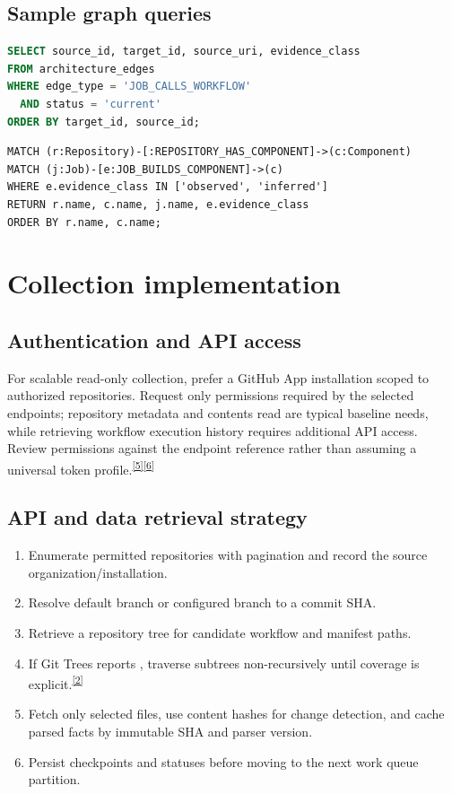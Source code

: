 \documentclass[11pt,letterpaper]{article}
\newcommand{\code}[1]{{\small\ttfamily\detokenize{#1}}}
\newcommand{\source}[1]{\textsuperscript{\hyperref[ref:#1]{[#1]}}}
\begin{document}
\subsection{Sample graph queries}
\begin{lstlisting}[language=SQL,caption={Investigate reusable workflow dependencies in a normalized SQL view.}]
SELECT source_id, target_id, source_uri, evidence_class
FROM architecture_edges
WHERE edge_type = 'JOB_CALLS_WORKFLOW'
  AND status = 'current'
ORDER BY target_id, source_id;
\end{lstlisting}

\begin{lstlisting}[language={},caption={Cypher example: candidate components associated with build jobs.}]
MATCH (r:Repository)-[:REPOSITORY_HAS_COMPONENT]->(c:Component)
MATCH (j:Job)-[e:JOB_BUILDS_COMPONENT]->(c)
WHERE e.evidence_class IN ['observed', 'inferred']
RETURN r.name, c.name, j.name, e.evidence_class
ORDER BY r.name, c.name;
\end{lstlisting}

\section{Collection implementation}
\subsection{Authentication and API access}
For scalable read-only collection, prefer a GitHub App installation scoped to authorized repositories. Request only permissions required by the selected endpoints; repository metadata and contents read are typical baseline needs, while retrieving workflow execution history requires additional API access. Review permissions against the endpoint reference rather than assuming a universal token profile.\source{5}\source{6}

\subsection{API and data retrieval strategy}
\begin{enumerate}
\item Enumerate permitted repositories with pagination and record the source organization/installation.
\item Resolve default branch or configured branch to a commit SHA.
\item Retrieve a repository tree for candidate workflow and manifest paths.
\item If Git Trees reports \code{truncated=true}, traverse subtrees non-recursively until coverage is explicit.\source{2}
\item Fetch only selected files, use content hashes for change detection, and cache parsed facts by immutable SHA and parser version.
\item Persist checkpoints and statuses before moving to the next work queue partition.
\end{enumerate}
\end{document}
